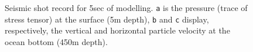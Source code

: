 \documentclass[10pt, conference]{IEEEtran}
\begin{document}
\begin{figure}
\centering
\captionsetup[subfigure]{labelformat=empty}
\caption{Seismic shot record for 5sec of modelling. \texttt{a} is the
pressure (trace of stress tensor) at the surface (5m depth), \texttt{b}
and \texttt{c} display, respectively, the vertical and horizontal
particle velocity at the ocean bottom (450m depth).}\label{ElasShot}
\end{figure}
\end{document}
